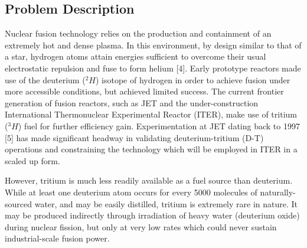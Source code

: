 \subsection{Problem Description}
\label{sec:problemdescription}

Nuclear fusion technology relies on the production and containment of an extremely hot and dense plasma. In this environment, by design similar to that of a star, hydrogen atoms attain energies sufficient to overcome their usual electrostatic repulsion and fuse to form helium [4]. Early prototype reactors made use of the deuterium ($^2H$) isotope of hydrogen in order to achieve fusion under more accessible conditions, but achieved limited success. The current frontier generation of fusion reactors, such as JET and the under-construction International Thermonuclear Experimental Reactor (ITER), make use of tritium ($^3H$) fuel for further efficiency gain. Experimentation at JET dating back to 1997 [5] has made significant headway in validating deuterium-tritium (D-T) operations and constraining the technology which will be employed in ITER in a scaled up form.

However, tritium is much less readily available as a fuel source than deuterium. While at least one deuterium atom occurs for every 5000 molecules of naturally-sourced water, and may be easily distilled, tritium is extremely rare in nature. It may be produced indirectly through irradiation of heavy water (deuterium oxide) during nuclear fission, but only at very low rates which could never sustain industrial-scale fusion power.

